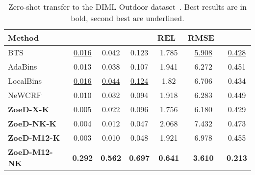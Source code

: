 \documentclass[10pt,twocolumn,letterpaper]{article}
\begin{document}
\begin{table}[htb]
\centering
\setlength{\tabcolsep}{3pt} \small
\begin{tabular}{@{}lcccccc@{}}
\toprule
Method &  &  &  & REL~ & RMSE~ & \\ \midrule
BTS~\cite{bts_lee2019big}               & \underline{0.016}     & 0.042     & 0.123     & 1.785     & \underline{5.908}     & \underline{0.428}    \\ 
AdaBins~\cite{bhat2021adabins}          & 0.013     & 0.038     & 0.107     & 1.941     & 6.272     & 0.451    \\ 
LocalBins~\cite{bhat2022localbins}      & \underline{0.016} & \underline{0.044} & \underline{0.124} &     1.82  &  6.706 &    0.434     \\
NeWCRF~\cite{yuan2022new}               & 0.010     & 0.032     & 0.094     & 1.918     & 6.283     & 0.449     \\ 
\midrule
\textbf{ZoeD-X-K}       & 0.005 & 0.022 & 0.096 &     \underline{1.756} &  6.180  &  0.429 \\ 
\textbf{ZoeD-NK-K}      & 0.004 & 0.012 & 0.047 &     2.068 &  7.432  &  0.473 \\ 
\textbf{ZoeD-M12-K}     & 0.003 & 0.010 & 0.048 &     1.921 &  6.978  &  0.455 \\
\textbf{ZoeD-M12-NK}    & \textbf{0.292} &\textbf{ 0.562} & \textbf{0.697} &      \textbf{0.641} &    \textbf{3.610} &     \textbf{0.213} \\
\bottomrule
\end{tabular}
\caption{Zero-shot transfer to the DIML Outdoor dataset~\cite{kim2018deep}. Best results are in bold, second best are underlined.}
\label{tab:diml-outdoor-full}
\end{table}
\end{document}
